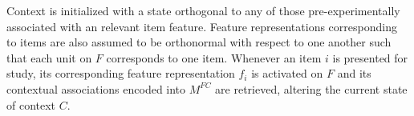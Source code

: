 {}Context is initialized with a state orthogonal to any of those pre-experimentally associated with an relevant item feature. Feature representations corresponding to items are also assumed to be orthonormal with respect to one another such that each unit on $F$ corresponds to one item.\markdownRendererInterblockSeparator
{}\markdownRendererInterblockSeparator
{}Whenever an item $i$ is presented for study, its corresponding feature representation $f_i$ is activated on $F$ and its contextual associations encoded into $M^{FC}$ are retrieved, altering the current state of context $C$.\relax